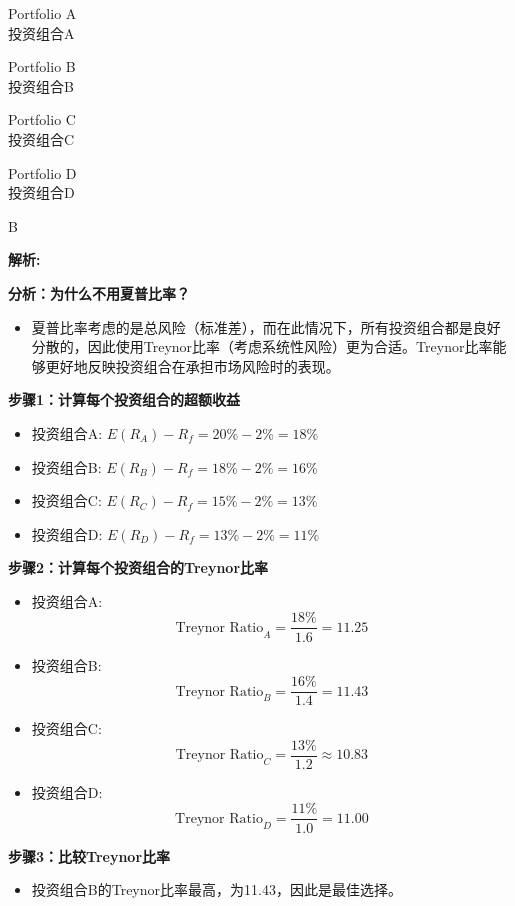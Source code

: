 \documentclass{article}
\newenvironment{explanation}
{\textbf{解析:}\par}
{\par}
\begin{document}
    \begin{choices}
        \item Portfolio A  \\
        投资组合A
        \item Portfolio B  \\
        投资组合B
        \item Portfolio C  \\
        投资组合C
        \item Portfolio D  \\
        投资组合D
    \end{choices}
    
    \begin{correctanswer}
    B
    \end{correctanswer}
    
    \begin{explanation}
        \textbf{分析：为什么不用夏普比率？}
        \begin{itemize}
            \item 夏普比率考虑的是总风险（标准差），而在此情况下，所有投资组合都是良好分散的，因此使用Treynor比率（考虑系统性风险）更为合适。Treynor比率能够更好地反映投资组合在承担市场风险时的表现。
        \end{itemize}

        \textbf{步骤1：计算每个投资组合的超额收益}
        \begin{itemize}
            \item 投资组合A: \(E(R_A) - R_f = 20\% - 2\% = 18\%\)
            \item 投资组合B: \(E(R_B) - R_f = 18\% - 2\% = 16\%\)
            \item 投资组合C: \(E(R_C) - R_f = 15\% - 2\% = 13\%\)
            \item 投资组合D: \(E(R_D) - R_f = 13\% - 2\% = 11\%\)
        \end{itemize}
    
        \textbf{步骤2：计算每个投资组合的Treynor比率}
        \begin{itemize}
            \item 投资组合A: 
            \[
            \text{Treynor Ratio}_A = \frac{18\%}{1.6} = 11.25
            \]
            \item 投资组合B: 
            \[
            \text{Treynor Ratio}_B = \frac{16\%}{1.4} = 11.43
            \]
            \item 投资组合C: 
            \[
            \text{Treynor Ratio}_C = \frac{13\%}{1.2} \approx 10.83
            \]
            \item 投资组合D: 
            \[
            \text{Treynor Ratio}_D = \frac{11\%}{1.0} = 11.00
            \]
        \end{itemize}
    
        \textbf{步骤3：比较Treynor比率}
        \begin{itemize}
            \item 投资组合B的Treynor比率最高，为11.43，因此是最佳选择。
        \end{itemize}
    
       
    \end{explanation}
    
\end{document}
